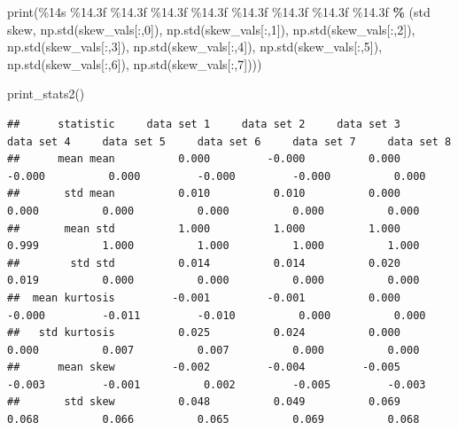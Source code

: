 \documentclass[
]{book}
\newenvironment{Shaded}{\begin{snugshade}}{\end{snugshade}}
\newcommand{\BuiltInTok}[1]{#1}
\newcommand{\DecValTok}[1]{\textcolor[rgb]{0.00,0.00,0.81}{#1}}
\newcommand{\NormalTok}[1]{#1}
\newcommand{\OperatorTok}[1]{\textcolor[rgb]{0.81,0.36,0.00}{\textbf{#1}}}
\newcommand{\SpecialCharTok}[1]{\textcolor[rgb]{0.00,0.00,0.00}{#1}}
\newcommand{\StringTok}[1]{\textcolor[rgb]{0.31,0.60,0.02}{#1}}
\begin{document}
\begin{Shaded}
\begin{Highlighting}[]
  \BuiltInTok{print}\NormalTok{(}\StringTok{\textquotesingle{}}\SpecialCharTok{\%14s}\StringTok{ }\SpecialCharTok{\%14.3f}\StringTok{ }\SpecialCharTok{\%14.3f}\StringTok{ }\SpecialCharTok{\%14.3f}\StringTok{ }\SpecialCharTok{\%14.3f}\StringTok{ }\SpecialCharTok{\%14.3f}\StringTok{ }\SpecialCharTok{\%14.3f}\StringTok{ }\SpecialCharTok{\%14.3f}\StringTok{ }\SpecialCharTok{\%14.3f}\StringTok{\textquotesingle{}} \OperatorTok{\%}\NormalTok{ (}\StringTok{\textquotesingle{}std skew\textquotesingle{}}\NormalTok{, np.std(skew\_vals[:,}\DecValTok{0}\NormalTok{]), np.std(skew\_vals[:,}\DecValTok{1}\NormalTok{]), np.std(skew\_vals[:,}\DecValTok{2}\NormalTok{]), np.std(skew\_vals[:,}\DecValTok{3}\NormalTok{]), np.std(skew\_vals[:,}\DecValTok{4}\NormalTok{]), np.std(skew\_vals[:,}\DecValTok{5}\NormalTok{]), np.std(skew\_vals[:,}\DecValTok{6}\NormalTok{]), np.std(skew\_vals[:,}\DecValTok{7}\NormalTok{])))}
  
\NormalTok{print\_stats2()  }
\end{Highlighting}
\end{Shaded}

\begin{verbatim}
##      statistic     data set 1     data set 2     data set 3     data set 4     data set 5     data set 6     data set 7     data set 8
##      mean mean          0.000         -0.000          0.000         -0.000          0.000         -0.000         -0.000          0.000
##       std mean          0.010          0.010          0.000          0.000          0.000          0.000          0.000          0.000
##       mean std          1.000          1.000          1.000          0.999          1.000          1.000          1.000          1.000
##        std std          0.014          0.014          0.020          0.019          0.000          0.000          0.000          0.000
##  mean kurtosis         -0.001         -0.001          0.000         -0.000         -0.011         -0.010          0.000          0.000
##   std kurtosis          0.025          0.024          0.000          0.000          0.007          0.007          0.000          0.000
##      mean skew         -0.002         -0.004         -0.005         -0.003         -0.001          0.002         -0.005         -0.003
##       std skew          0.048          0.049          0.069          0.068          0.066          0.065          0.069          0.068
\end{verbatim}

  
\end{document}

